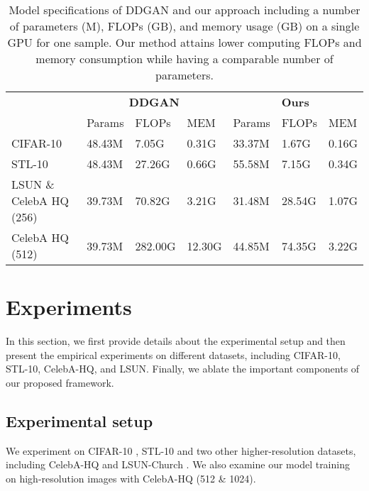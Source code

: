 \documentclass[10pt,twocolumn,letterpaper]{article}
\newcommand{\minisection}[1]{\vspace{2mm}\noindent{\textbf{#1}}}
\begin{document}
\begin{table*}[t]
\centering
\begin{tabular}{l|lll|lll}
        \toprule
        \multirow{2}{*}{}       & \multicolumn{3}{c|}{\textbf{DDGAN}} & \multicolumn{3}{c}{\textbf{Ours}} \\
                                & Params & FLOPs   & MEM    & Params  & FLOPs  & MEM   \\
        \midrule
        CIFAR-10                & 48.43M & 7.05G   & 0.31G  & 33.37M  & 1.67G  & 0.16G \\
        STL-10                  & 48.43M & 27.26G  & 0.66G  & 55.58M  & 7.15G  & 0.34G \\
        LSUN \& CelebA HQ (256) & 39.73M & 70.82G  & 3.21G  & 31.48M  & 28.54G & 1.07G \\
        CelebA HQ (512)         & 39.73M  & 282.00G & 12.30G & 44.85M   & 74.35G & 3.22G \\
        \bottomrule
        \end{tabular}
\vspace{-2mm}
    \caption{Model specifications of DDGAN\cite{xiao2021tackling} and our approach including a number of parameters (M), FLOPs (GB), and memory usage (GB) on a single GPU for one sample. Our method attains lower computing FLOPs and memory consumption while having a comparable number of parameters.}
    \vspace{-2mm}
    \label{tab:model_specs}
\end{table*}

\section{Experiments} \label{sec:exp}
In this section, we first provide details about the experimental setup and then present the empirical experiments on different datasets, including CIFAR-10, STL-10, CelebA-HQ, and LSUN. Finally, we ablate the important components of our proposed framework.
\subsection{Experimental setup} 
\minisection{Datasets} We experiment on CIFAR-10 , STL-10  and two other higher-resolution datasets, including CelebA-HQ  and LSUN-Church . We also examine our model training on high-resolution images with CelebA-HQ (512 \& 1024).
\end{document}
